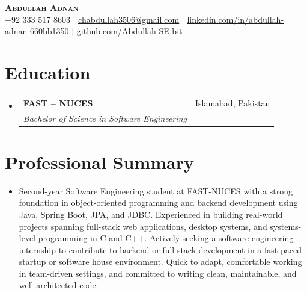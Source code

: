 \documentclass[letterpaper,11pt]{article}
\makeatletter
\newcommand{\resumeItem}[1]{
  \item\small{
    {#1 \vspace{-2pt}}
  }
}
\newcommand{\resumeSubheading}[4]{
  \vspace{-2pt}\item
    \begin{tabular*}{0.97\textwidth}[t]{l@{\extracolsep{\fill}}r}
      \textbf{#1} & #2 \\
      \textit{\small#3} & \textit{\small #4} \\
    \end{tabular*}\vspace{-7pt}
}
\newcommand{\resumeSubItem}[1]{\resumeItem{#1}\vspace{-4pt}}
\newcommand{\resumeSubHeadingListStart}{\begin{itemize}[leftmargin=0.15in, label={}]}
\newcommand{\resumeSubHeadingListEnd}{\end{itemize}}
\makeatother
\begin{document}
\begin{center}
    \textbf{\Huge \scshape Abdullah Adnan} \\ \vspace{1pt}
    \small +92 333 517 8603 $|$ \href{mailto:chabdullah3506@gmail.com}{\underline{chabdullah3506@gmail.com}} $|$ 
    \href{https://www.linkedin.com/in/abdullah-adnan-660bb1350}{\underline{linkedin.com/in/abdullah-adnan-660bb1350}} $|$
    \href{https://github.com/Abdullah-SE-bit}{\underline{github.com/Abdullah-SE-bit}}
\end{center}


\section{Education}
  \resumeSubHeadingListStart
    \resumeSubheading
      {FAST -- NUCES}{Islamabad, Pakistan}
      {Bachelor of Science in Software Engineering}{}
  \resumeSubHeadingListEnd


\section{Professional Summary}
  \resumeSubHeadingListStart
    \resumeSubItem{Second-year Software Engineering student at FAST-NUCES with a strong foundation in object-oriented programming and backend development using Java, Spring Boot, JPA, and JDBC. Experienced in building real-world projects spanning full-stack web applications, desktop systems, and systems-level programming in C and C++. Actively seeking a software engineering internship to contribute to backend or full-stack development in a fast-paced startup or software house environment. Quick to adapt, comfortable working in team-driven settings, and committed to writing clean, maintainable, and well-architected code.}
  \resumeSubHeadingListEnd


\end{document}
